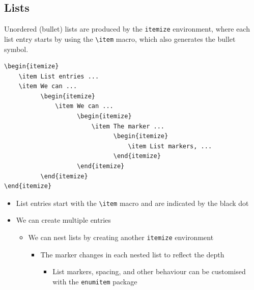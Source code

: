 \documentclass[11pt, twoside]{article}
\begin{document}
\subsection{Lists}
Unordered (bullet) lists are produced by the \lstinline{itemize} environment,
where each list entry starts by using the \lstinline{\item} macro, which
also generates the bullet symbol.
\begin{lstlisting}
\begin{itemize}
    \item List entries ...
    \item We can ...
          \begin{itemize}
              \item We can ...
                    \begin{itemize}
                        \item The marker ...
                              \begin{itemize}
                                  \item List markers, ...
                              \end{itemize}
                    \end{itemize}
          \end{itemize}
\end{itemize}
\end{lstlisting}
\begin{itemize}
    \item List entries start with the \lstinline{\item} macro and are indicated by the black dot
    \item We can create multiple entries
          \begin{itemize}
              \item We can nest lists by creating another \lstinline{itemize} environment
                    \begin{itemize}
                        \item The marker changes in each nested list to reflect the depth
                              \begin{itemize}
                                  \item List markers, spacing, and other behaviour can be customised with the \lstinline{enumitem} package
                              \end{itemize}
                    \end{itemize}
          \end{itemize}
\end{itemize}
\end{document}
